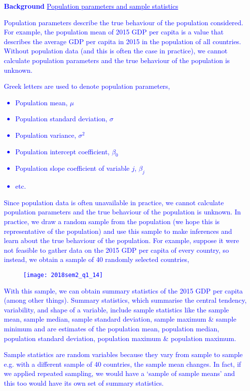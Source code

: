 \documentclass[12pt]{report}
\newenvironment{blueframed}[1][blue]
{\def\FrameCommand{\fboxsep=\FrameSep\fcolorbox{#1}{white}}%
\MakeFramed {\advance\hsize-\width \FrameRestore}}
{\endMakeFramed}
\begin{document}
\justify
\begin{blueframed}
	\textcolor{blue}{\textbf{Background}}
	\vspace{-\baselineskip}
	\justify
	\textcolor{blue}{\underline{Population parameters and sample statistics}}
	
	\noindent \textcolor{blue}
	{
		Population parameters describe the true behaviour of the population considered. For example, the population mean of 2015 GDP per capita is a value that describes the average GDP per capita in 2015 in the population of all countries. Without population data (and this is often the case in practice), we cannot calculate population parameters and the true behaviour of the population is unknown.}
\end{blueframed} 
\begin{blueframed} \textcolor{blue}{\vspace{-\baselineskip} \noindent Greek letters are used to denote population parameters, \begin{itemize}
			\item Population mean, $\mu$
			\item Population standard deviation, $\sigma$
			\item Population variance, $\sigma^2$
			\item Population intercept coefficient, $\beta_0$
			\item Population slope coefficient of variable $j$, $\beta_j$
			\item etc.
		\end{itemize} Since population data is often unavailable in practice, we cannot calculate population parameters and the true behaviour of the population is unknown. In practice, we draw a random sample from the population (we hope this is representative of the population) and use this sample to make inferences and learn about the true behaviour of the population. For example, suppose it were not feasible to gather data on the 2015 GDP per capita of every country, so instead, we obtain a sample of 40 randomly selected countries, \begin{figure}[H]
		\centerline{\texttt{[image: 2018sem2\_q1\_14]}}
	\end{figure}
\vspace{-\baselineskip} \noindent With this sample, we can obtain summary statistics of the 2015 GDP per capita (among other things). Summary statistics, which summarise the central tendency, variability, and shape of a variable, include sample statistics like the sample mean, sample median, sample standard deviation, sample maximum \& sample minimum and are estimates of the population mean, population median, population standard deviation, population maximum \& population maximum.}
\end{blueframed}
\begin{blueframed} \noindent \textcolor{blue}{\noindent Sample statistics are random variables because they vary from sample to sample e.g. with a different sample of 40 countries, the sample mean changes. In fact, if we applied repeated sampling, we would have a `sample of sample means' and this too would have its own set of summary statistics.}
\end{blueframed}
\end{document}
